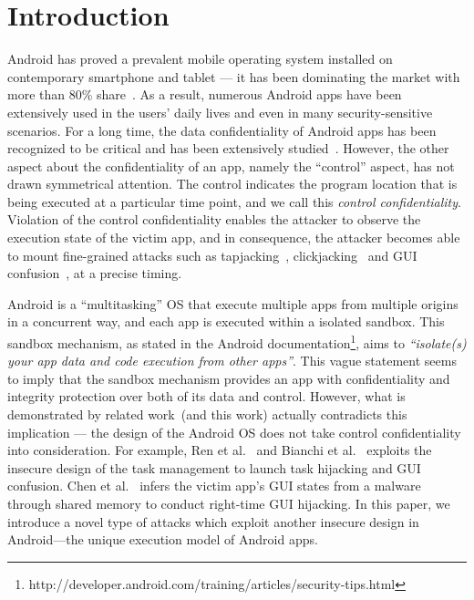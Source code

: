 \section{Introduction}
Android has proved a prevalent mobile operating system installed on contemporary smartphone and tablet --- it has been dominating the market with more than 80\% share~\cite{idc}. 
As a result, numerous Android apps have been extensively used in the users' daily lives and even in many security-sensitive scenarios. 
For a long time, the data confidentiality of Android apps has been recognized to be critical and has been extensively studied~\cite{flowdroid,....@chenkai,find 4 here}. 
However, the other aspect about the confidentiality of an app, namely the ``control'' aspect, 
has not drawn symmetrical attention. 
The control indicates the program location that is being executed at a particular time point, 
and we call this \emph{control confidentiality}. 
Violation of the control confidentiality enables the attacker to observe the execution state of the victim app, 
and in consequence, the attacker becomes able to mount fine-grained attacks such as tapjacking~\cite{@chenkai: add citation here, you can find the citation in the oakland paper}, 
clickjacking~\cite{find one or two, may be GUI state paper mentioned some} and GUI confusion~\cite{oakland paper}, at a precise timing. 

Android is a ``multitasking'' OS that execute multiple apps from multiple origins in a concurrent way, and  
each app is executed within a isolated sandbox. 
This sandbox mechanism, as stated in the Android documentation\footnote{http://developer.android.com/training/articles/security-tips.html}, aims to \emph{``isolate(s) your app data and code execution from other apps''}. 
This vague statement seems to imply that the sandbox mechanism 
provides an app with confidentiality and integrity protection over both of its data and control.  
However, what is demonstrated by related work~(and this work) actually contradicts this implication ---
the design of the Android OS does not take control confidentiality into consideration. 
For example, Ren et al.~\cite{usenix15 paper} and Bianchi et al.~\cite{oakland paper} 
exploits the insecure design of the task management to launch task hijacking and GUI confusion. 
Chen et al.~\cite{GUI state paper} infers the victim app's GUI states from a malware through shared memory to conduct right-time GUI hijacking. 
In this paper, we introduce a novel type of attacks which exploit another insecure design in Android---the unique execution model of Android apps.

